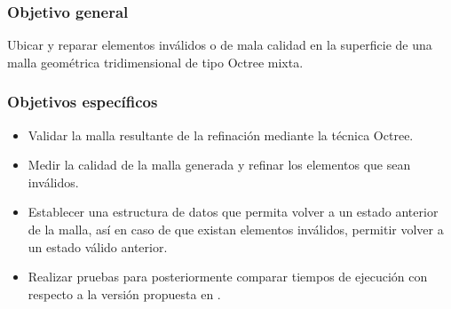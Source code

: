 \subsubsection{Objetivo general}
Ubicar y reparar elementos inválidos o de mala calidad en la superficie de una malla geométrica tridimensional de tipo Octree mixta.

\subsubsection{Objetivos específicos}
\begin{itemize}
    \item Validar la malla resultante de la refinación mediante la técnica Octree.
    \item Medir la calidad de la malla generada y refinar los elementos que sean inválidos.
    \item Establecer una estructura de datos que permita volver a un estado anterior de la malla, así en caso de que existan elementos inválidos, permitir volver a un estado válido anterior.
    \item Realizar pruebas para posteriormente comparar tiempos de ejecución con respecto a la versión propuesta en \cite{daines2018repairing}.
\end{itemize}

